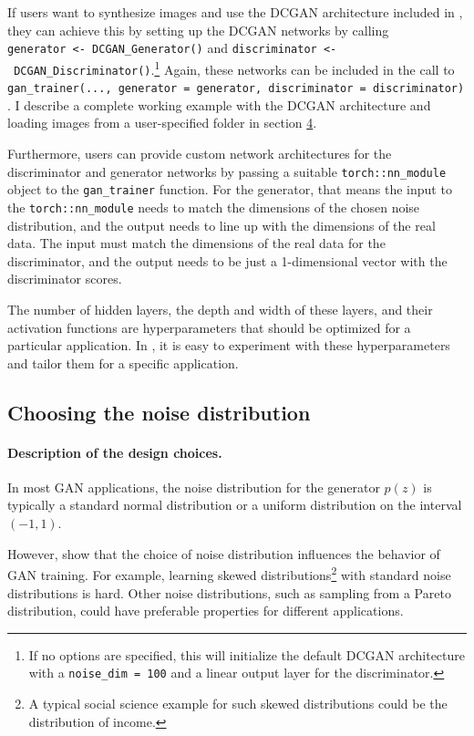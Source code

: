 If users want to synthesize images and use the DCGAN architecture included in , they can achieve this by setting up the DCGAN networks by calling \texttt{generator\ \textless{}-\ DCGAN\_Generator()} and \texttt{discriminator\ \textless{}-\ DCGAN\_Discriminator()}.\footnote{If no options are specified, this will initialize the default
  DCGAN architecture with a \texttt{noise\_dim\ =\ 100} and a linear output layer for the
  discriminator.} Again, these networks can be included in the call to \texttt{gan\_trainer(...,\ generator\ =\ generator,\ discriminator\ =\ discriminator)}. I describe a complete working example with the DCGAN architecture and loading images from a user-specified folder in section \hyperref[sec:illustrations]{4}.

Furthermore, users can provide custom network architectures for the discriminator and generator networks by passing a suitable \texttt{torch::nn\_module} object to the \texttt{gan\_trainer} function. For the generator, that means the input to the \texttt{torch::nn\_module} needs to match the dimensions of the chosen noise distribution, and the output needs to line up with the dimensions of the real data. The input must match the dimensions of the real data for the discriminator, and the output needs to be just a 1-dimensional vector with the discriminator scores.

The number of hidden layers, the depth and width of these layers, and their activation functions are hyperparameters that should be optimized for a particular application. In , it is easy to experiment with these hyperparameters and tailor them for a specific application.

\subsection{Choosing the noise distribution}\label{sec:noise}

\paragraph{Description of the design choices.}\label{description-of-the-design-choices.-2}

In most GAN applications, the noise distribution for the generator \(p(z)\) is typically a standard normal distribution or a uniform distribution on the interval \((-1,1)\).

However, \citet{huster21a} show that the choice of noise distribution influences the behavior of GAN training. For example, learning skewed distributions\footnote{A typical social science example for such skewed distributions
  could be the distribution of income.} with standard noise distributions is hard. Other noise distributions, such as sampling from a Pareto distribution, could have preferable properties for different applications.

